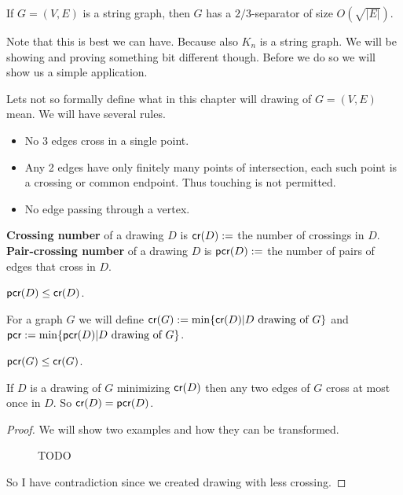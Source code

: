 \begin{thm}[Lee, 2017]
	If $G = (V,E)$ is a string graph, then $G$ has a $2/3$-separator of size $O(\sqrt{|E|})$.
	\label{lee}
\end{thm}

\noindent Note that this is best we can have. Because also $K_n$ is a string graph. We will be showing and proving something bit different though. Before we do so we will show us a simple application.

Lets not so formally define what in this chapter will drawing of $G = (V,E)$ mean. We will have several rules.

\begin{itemize}
	\item No 3 edges cross in a single point.
	\item Any 2 edges have only finitely many points of intersection, each such point is a crossing or common endpoint. Thus touching is not permitted.
	\item No edge passing through a vertex.
\end{itemize}

\begin{defn}
	\textbf{Crossing number} of a drawing $D$ is $\textsf{cr}(D) :=$ the number of crossings in $D$. \textbf{Pair-crossing number} of a drawing $D$ is $\textsf{pcr}(D) :=$ the number of pairs of edges that cross in $D$.
\end{defn}

\begin{observ}
	$\textsf{pcr}(D) \leq \textsf{cr}(D)$.
\end{observ}

For a graph $G$ we will define $\textsf{cr}(G) := \min \{\textsf{cr}(D) | D \text{ drawing of } G\}$ and $\textsf{pcr} := \min \{\textsf{pcr}(D) | D \text{ drawing of } G\}$.

\begin{observ}
	$\textsf{pcr}(G) \leq \textsf{cr}(G)$.
\end{observ}

\begin{lemma}
	If $D$ is a drawing of $G$ minimizing $\textsf{cr}(D)$ then any two edges of $G$ cross at most once in $D$. So $\textsf{cr}(D) = \textsf{pcr}(D)$.
\end{lemma}

\begin{proof}
	We will show two examples and how they can be transformed.
	
	\begin{figure}
		\caption{TODO}
	\end{figure}
	
	So I have contradiction since we created drawing with less crossing.
\end{proof}

